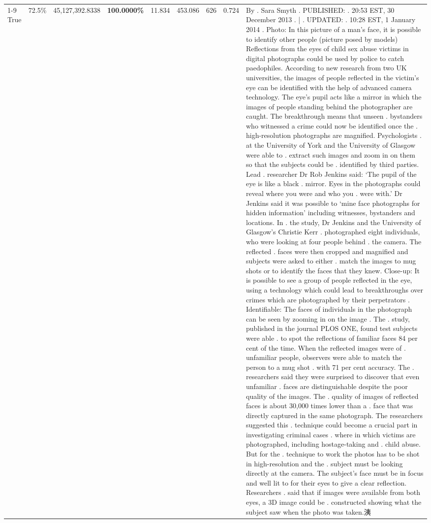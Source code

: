 \begin{table}[H]
\begin{tabular}{lllrlllll}
\cline{1-9}
True & 72.5\% & 45,127,392.8338 & \bfseries \color{red} 100.0000\% & 11.834 & 453.086 & 626 & 0.724 & By . Sara Smyth . PUBLISHED: . 20:53 EST, 30 December 2013 . | . UPDATED: . 10:28 EST, 1 January 2014 . Photo: In this picture of a man's face, it is possible to identify other people (picture posed by models) Reflections from the eyes of child sex abuse victims in digital photographs could be used by police to catch paedophiles. According to new research from two UK universities, the images of people reflected in the victim's eye can be identified with the help of advanced camera technology. The eye's pupil acts like a mirror in which the images of people standing behind the photographer are caught. The breakthrough means that unseen . bystanders who witnessed a crime could now be identified once the . high-resolution photographs are magnified. Psychologists . at the University of York and the University of Glasgow were able to . extract such images and zoom in on them so that the subjects could be . identified by third parties. Lead . researcher Dr Rob Jenkins said: ‘The pupil of the eye is like a black . mirror. Eyes in the photographs could reveal where you were and who you . were with.' Dr Jenkins said it was possible to ‘mine face photographs for hidden information' including witnesses, bystanders and locations. In . the study, Dr Jenkins and the University of Glasgow's Christie Kerr . photographed eight individuals, who were looking at four people behind . the camera. The reflected . faces were then cropped and magnified and subjects were asked to either . match the images to mug shots or to identify the faces that they knew. Close-up: It is possible to see a group of people reflected in the eye, using a technology which could lead to breakthroughs over crimes which are photographed by their perpetrators . Identifiable: The faces of individuals in the photograph can be seen by zooming in on the image . The . study, published in the journal PLOS ONE, found test subjects were able . to spot the reflections of familiar faces 84 per cent of the time. When the reflected images were of . unfamiliar people, observers were able to match the person to a mug shot . with 71 per cent accuracy. The . researchers said they were surprised to discover that even unfamiliar . faces are distinguishable despite the poor quality of the images. The . quality of images of reflected faces is about 30,000 times lower than a . face that was directly captured in the same photograph. The researchers suggested this . technique could become a crucial part in investigating criminal cases . where in which victims are photographed, including hostage-taking and . child abuse. But for the . technique to work the photos has to be shot in high-resolution and the . subject must be looking directly at the camera. The subject's face must be in focus and well lit to for their eyes to give a clear reflection. Researchers . said that if images were available from both eyes, a 3D image could be . constructed showing what the subject saw when the photo was taken.洟 \\

\end{tabular}
\end{table}
